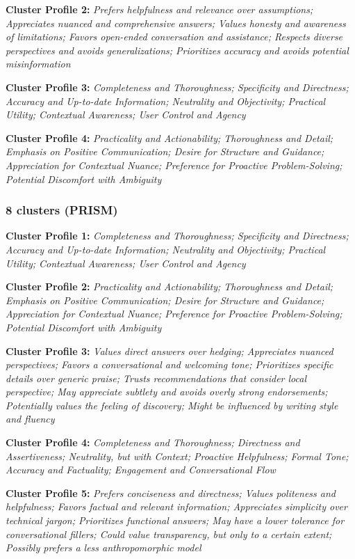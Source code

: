 \documentclass[11pt]{article}
\newcommand{\profiletext}[1]{\textit{#1}}
\begin{document}
\textbf{Cluster Profile 2:} \profiletext{Prefers helpfulness and relevance over assumptions; Appreciates nuanced and comprehensive answers; Values honesty and awareness of limitations; Favors open-ended conversation and assistance; Respects diverse perspectives and avoids generalizations; Prioritizes accuracy and avoids potential misinformation}

\textbf{Cluster Profile 3:} \profiletext{Completeness and Thoroughness; Specificity and Directness; Accuracy and Up-to-date Information; Neutrality and Objectivity; Practical Utility; Contextual Awareness; User Control and Agency}

\textbf{Cluster Profile 4:} \profiletext{Practicality and Actionability; Thoroughness and Detail; Emphasis on Positive Communication; Desire for Structure and Guidance; Appreciation for Contextual Nuance; Preference for Proactive Problem-Solving; Potential Discomfort with Ambiguity}

\subsubsection{8 clusters (PRISM)}

\textbf{Cluster Profile 1:} \profiletext{Completeness and Thoroughness; Specificity and Directness; Accuracy and Up-to-date Information; Neutrality and Objectivity; Practical Utility; Contextual Awareness; User Control and Agency}

\textbf{Cluster Profile 2:} \profiletext{Practicality and Actionability; Thoroughness and Detail; Emphasis on Positive Communication; Desire for Structure and Guidance; Appreciation for Contextual Nuance; Preference for Proactive Problem-Solving; Potential Discomfort with Ambiguity}

\textbf{Cluster Profile 3:} \profiletext{Values direct answers over hedging; Appreciates nuanced perspectives; Favors a conversational and welcoming tone; Prioritizes specific details over generic praise; Trusts recommendations that consider local perspective; May appreciate subtlety and avoids overly strong endorsements; Potentially values the feeling of discovery; Might be influenced by writing style and fluency}

\textbf{Cluster Profile 4:} \profiletext{Completeness and Thoroughness; Directness and Assertiveness; Neutrality, but with Context; Proactive Helpfulness; Formal Tone; Accuracy and Factuality; Engagement and Conversational Flow}

\textbf{Cluster Profile 5:} \profiletext{Prefers conciseness and directness; Values politeness and helpfulness; Favors factual and relevant information; Appreciates simplicity over technical jargon; Prioritizes functional answers; May have a lower tolerance for conversational fillers; Could value transparency, but only to a certain extent; Possibly prefers a less anthropomorphic model}
\end{document}
